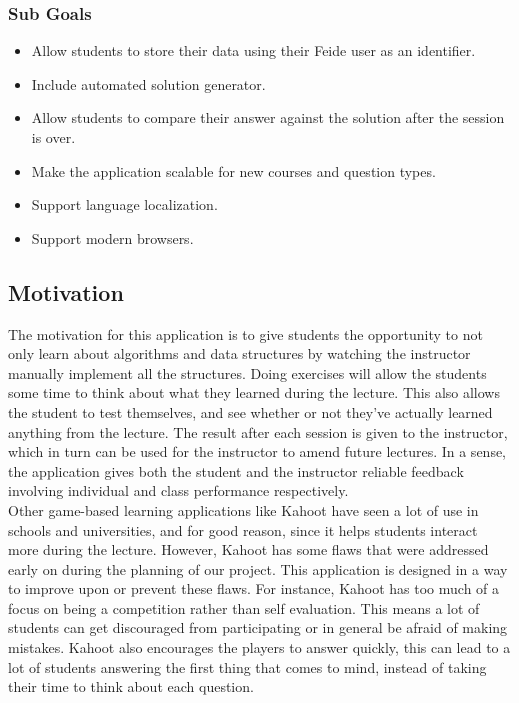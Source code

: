 \subsubsection{Sub Goals}
\begin{itemize}
\item Allow students to store their data using their Feide user as an identifier.
\item Include automated solution generator.
\item Allow students to compare their answer against the solution after the session is over.
\item Make the application scalable for new courses and question types.
\item Support language localization.
\item Support modern browsers.
\end{itemize}

\subsection{Motivation}
The motivation for this application is to give students the opportunity to not only learn about algorithms and data structures by watching the instructor manually implement all the structures. Doing exercises will allow the students some time to think about what they learned during the lecture. This also allows the student to test themselves, and see whether or not they've actually learned anything from the lecture. The result after each session is given to the instructor, which in turn can be used for the instructor to amend future lectures. In a sense, the application gives both the student and the instructor reliable feedback involving individual and class performance respectively.
\\[11pt]
Other game-based learning applications like Kahoot have seen a lot of use in schools and universities, and for good reason, since it helps students interact more during the lecture. However, Kahoot has some flaws that were addressed early on during the planning of our project. This application is designed in a way to improve upon or prevent these flaws. For instance, Kahoot has too much of a focus on being a competition rather than self evaluation. This means a lot of students can get discouraged from participating or in general be afraid of making mistakes. Kahoot also encourages the players to answer quickly, this can lead to a lot of students answering the first thing that comes to mind, instead of taking their time to think about each question.


